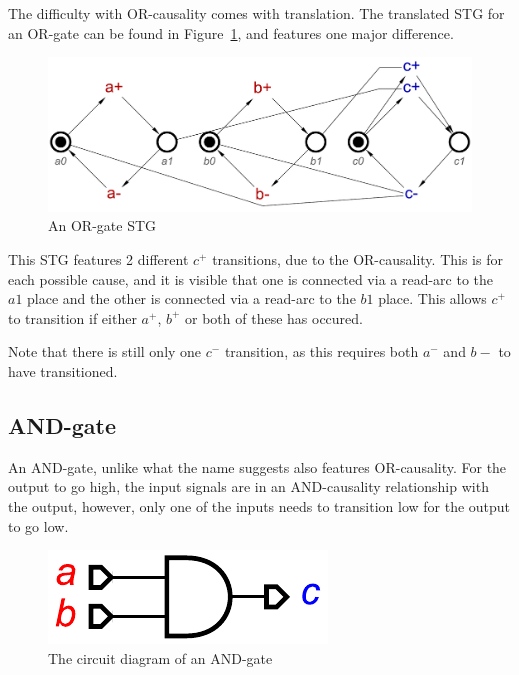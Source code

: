 \documentclass[british, journal]{IEEEtran}
\begin{document}
\noindent The difficulty with OR-causality comes with translation. The translated STG for an OR-gate
can be found in Figure~\ref{fig:or-gate-stg}, and features one major difference.
\vspace{-3mm}
\begin{figure}[h]
\begin{centering}
\includegraphics[scale=0.25]{Images/or-gate-stg}
\par\end{centering}
\vspace{-1mm}
\protect\caption{\label{fig:or-gate-stg} An OR-gate STG}
\vspace{-3mm}
\end{figure}

This STG features 2 different $c^{+}$ transitions, due to the OR-causality. 
This is for each possible cause, and it is visible that one is connected via a 
read-arc to the $a1$ place and the other is connected via a read-arc to 
the $b1$ place. This allows $c^{+}$ to transition if either $a^{+}$, 
$b^{+}$ or both of these has occured.

Note that there is still only one $c^{-}$ transition, as this requires both
$a^{-}$ and $b{-}$ to have transitioned. 

\subsection{AND-gate}

An AND-gate, unlike what the name suggests also features OR-causality. 
For the output to go high, the input signals are in an AND-causality relationship
with the output, however, only one of the inputs needs to transition low for the 
output to go low. 

\vspace{-3mm}

\begin{figure}[h]
\begin{centering}
\includegraphics[scale=0.55]{Images/and-gate-circuit}
\par\end{centering}

\protect\caption{\label{fig:or-gate-circuit} The circuit diagram of an AND-gate}
\vspace{-3mm}
\end{figure}
\end{document}
